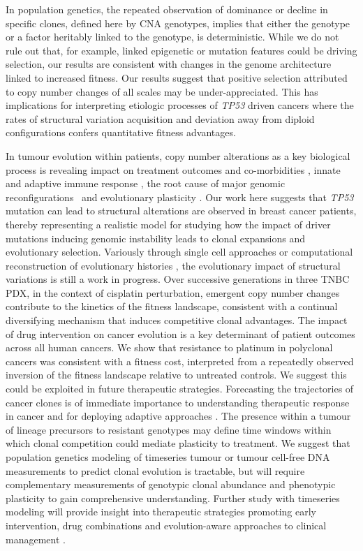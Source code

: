 In population genetics, the repeated observation of dominance or decline in specific clones, defined here by CNA genotypes, implies that either the genotype or a factor heritably linked to the genotype, is deterministic. 
While we do not rule out that, for example, linked epigenetic or mutation features could be driving selection, our results are consistent with changes in the genome architecture linked to increased fitness.  
Our results suggest that positive selection attributed to copy number changes of all scales may be under-appreciated. This has implications for interpreting etiologic processes of \textit{TP53} driven cancers where the rates of structural variation acquisition and deviation away from diploid configurations confers quantitative fitness advantages.

In tumour evolution within patients, copy number alterations as a key biological process is revealing impact on treatment outcomes and co-morbidities \cite{Bielski2018-cm}, innate and adaptive immune response \cite{Bakhoum2018-ko,Davoli2017-mf}, the root cause of major genomic reconfigurations~\cite{Umbreit2020-ls} and evolutionary plasticity \cite{Lopez2020-ku}. 
Our work here suggests that \textit{TP53} mutation can lead to structural alterations are observed in breast cancer patients, thereby representing a realistic model for studying how the impact of driver mutations inducing genomic instability leads to clonal expansions and evolutionary selection. Variously through single cell approaches \cite{gao2016punctuated} or computational reconstruction of evolutionary histories \cite{Gerstung2020-jl}, the evolutionary impact of structural variations is still a work in progress. Over successive generations in three TNBC PDX, in the context of cisplatin perturbation, emergent copy number changes contribute to the kinetics of the fitness landscape, consistent with a continual diversifying mechanism that induces competitive clonal advantages.  
The impact of drug intervention on cancer evolution is a key determinant of patient outcomes across all human cancers.  
We show that resistance to platinum in polyclonal cancers was consistent with a fitness cost, interpreted from a repeatedly observed inversion of the fitness landscape relative to untreated controls. We suggest this could be exploited in future therapeutic strategies. Forecasting the trajectories of cancer clones is of immediate importance to understanding therapeutic response in cancer and for deploying adaptive approaches \cite{Vasan2019-mt}. The presence within a tumour of lineage precursors to resistant genotypes may define time windows within which clonal competition could mediate plasticity to treatment. We suggest that population genetics modeling of timeseries tumour or tumour cell-free DNA measurements to predict clonal evolution is tractable, but will require complementary measurements of genotypic clonal abundance and phenotypic plasticity to gain comprehensive understanding. Further study with timeseries modeling will provide insight into therapeutic strategies promoting early intervention, drug combinations and evolution-aware approaches to clinical management \cite{Acar2020-tf}.